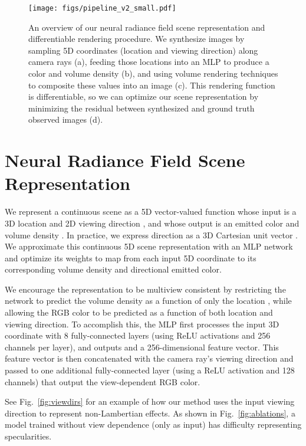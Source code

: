 \documentclass[runningheads]{llncs}
\begin{document}
\begin{figure}[t]
\centering
\texttt{[image: figs/pipeline\_v2\_small.pdf]}
\caption{
An overview of our neural radiance field scene representation and differentiable rendering procedure. We synthesize images by sampling 5D coordinates (location and viewing direction) along camera rays (a), feeding those locations into an MLP to produce a color and volume density (b), and using volume rendering techniques to composite these values into an image (c). This rendering function is differentiable, so we can optimize our scene representation by minimizing the residual between synthesized and ground truth observed images (d).
}
\label{fig:pipeline}
\end{figure}


\section{Neural Radiance Field Scene Representation}

We represent a continuous scene as a 5D vector-valued function whose input is a 3D location  and 2D viewing direction , and whose output is an emitted color  and volume density . In practice, we express direction as a 3D Cartesian unit vector . We approximate this continuous 5D scene representation with an MLP network  and optimize its weights  to map from each input 5D coordinate to its corresponding volume density and directional emitted color. 

We encourage the representation to be multiview consistent by restricting the network to predict the volume density  as a function of only the location , while allowing the RGB color  to be predicted as a function of both location and viewing direction. To accomplish this, the MLP  first processes the input 3D coordinate  with 8 fully-connected layers (using ReLU activations and 256 channels per layer), and outputs  and a 256-dimensional feature vector. This feature vector is then concatenated with the camera ray's viewing direction and passed to one additional fully-connected layer (using a ReLU activation and 128 channels) that output the view-dependent RGB color.

See Fig.~\ref{fig:viewdirs} for an example of how our method uses the input viewing direction to represent non-Lambertian effects.
As shown in Fig.~\ref{fig:ablations}, a model trained without view dependence (only  as input) has difficulty representing specularities.
\end{document}
